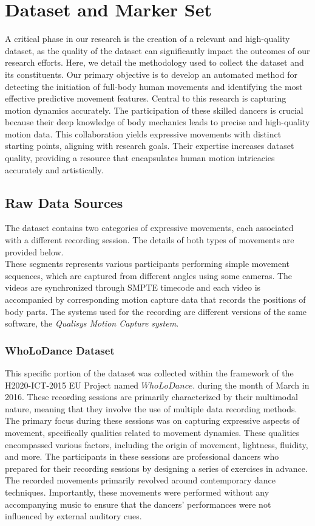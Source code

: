 \chapter{Dataset and Marker Set}
\label{chapter:dataset}
A critical phase in our research is the creation of a relevant and high-quality dataset, 
as the quality of the dataset can significantly impact the outcomes of our research efforts.
Here, we detail the methodology used to collect the dataset and its constituents.
Our primary objective is to develop an automated method for detecting the initiation of full-body human movements and identifying the most effective predictive movement features.
Central to this research is capturing motion dynamics accurately.
The participation of these skilled dancers is crucial because their deep knowledge of body mechanics leads to precise and high-quality motion data.
This collaboration yields expressive movements with distinct starting points, aligning with research goals.
Their expertise increases dataset quality, providing a resource that encapsulates human motion intricacies accurately and artistically.

\section{Raw Data Sources}
\label{sec:dataset}
The dataset contains two categories of expressive movements, each associated with a different recording session.
The details of both types of movements are provided below.\\
These segments represents various participants performing simple movement sequences, which are captured from different angles using some cameras.
The videos are synchronized through SMPTE timecode and each video is accompanied by corresponding motion capture data that records the positions of body parts.
The systems used for the recording are different versions of the same software, the \textit{Qualisys Motion Capture system}.


\subsection{WhoLoDance Dataset}
This specific portion of the dataset was collected within the framework of the H2020-ICT-2015 EU Project named $WhoLoDance$.
during the month of March in 2016.
These recording sessions are primarily characterized by their multimodal nature, 
meaning that they involve the use of multiple data recording methods. 
The primary focus during these sessions was on capturing expressive aspects of movement, 
specifically qualities related to movement dynamics. These qualities encompassed various factors, 
including the origin of movement, lightness, fluidity, and more.
The participants in these sessions are professional dancers 
who prepared for their recording sessions by designing a series of exercises in advance. 
The recorded movements primarily revolved around contemporary dance techniques. 
Importantly, these movements were performed without any accompanying music to ensure that 
the dancers' performances were not influenced by external auditory cues.

